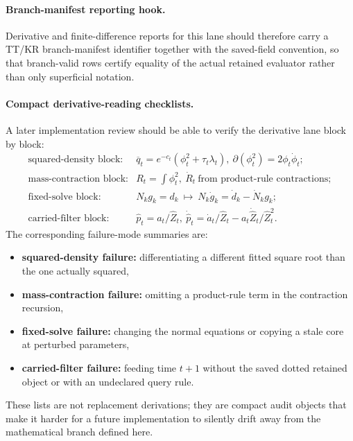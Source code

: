 \paragraph{Branch-manifest reporting hook.}
Derivative and finite-difference reports for this lane should therefore carry a
TT/KR branch-manifest identifier together with the saved-field convention, so
that branch-valid rows certify equality of the actual retained evaluator rather
than only superficial notation.

\paragraph{Compact derivative-reading checklists.}
A later implementation review should be able to verify the derivative lane block
by block:
\begin{equation}
\begin{array}{ll}
\text{squared-density block:} & \overline q_t=e^{-c_t}(\phi_t^2+\tau_t\lambda_t),\ \partial(\phi_t^2)=2\phi_t\dot\phi_t;\\[1mm]
\text{mass-contraction block:} & R_t=\int \phi_t^2,\ \dot R_t\ \text{from product-rule contractions};\\[1mm]
\text{fixed-solve block:} & N_kg_k=d_k\ \mapsto\ N_k\dot g_k=\dot d_k-\dot N_kg_k;\\[1mm]
\text{carried-filter block:} & \widehat p_t=a_t/\widehat Z_t,\ \dot{\widehat p}_t=\dot a_t/\widehat Z_t-a_t\dot{\widehat Z}_t/\widehat Z_t^2.
\end{array}
  \label{eq:bf-hd-ttkr-derivative-checklists}
\end{equation}
The corresponding failure-mode summaries are:
\begin{itemize}[leftmargin=0.28in]
  \item \textbf{squared-density failure:} differentiating a different fitted
  square root than the one actually squared,
  \item \textbf{mass-contraction failure:} omitting a product-rule term in the
  contraction recursion,
  \item \textbf{fixed-solve failure:} changing the normal equations or copying a
  stale core at perturbed parameters,
  \item \textbf{carried-filter failure:} feeding time \(t+1\) without the saved
  dotted retained object or with an undeclared query rule.
\end{itemize}
These lists are not replacement derivations; they are compact audit objects that
make it harder for a future implementation to silently drift away from the
mathematical branch defined here.

